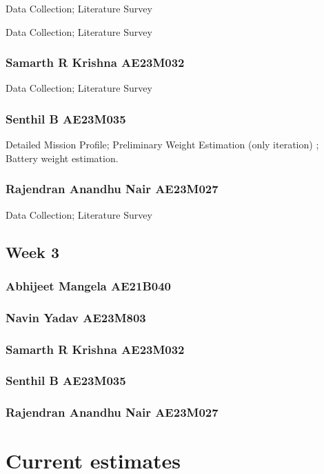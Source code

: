 \documentclass[12 pt]{article}
\begin{document}
Data Collection; Literature Survey


Data Collection; Literature Survey

\subsubsection{Samarth R Krishna AE23M032}

Data Collection; Literature Survey

\subsubsection{Senthil B AE23M035}

Detailed Mission Profile; Preliminary Weight Estimation (only iteration) ; Battery weight estimation.

\subsubsection{Rajendran Anandhu Nair AE23M027}

Data Collection; Literature Survey




\subsection{Week 3}

\subsubsection{Abhijeet Mangela AE21B040}


\subsubsection{Navin Yadav AE23M803}





\subsubsection{Samarth R Krishna AE23M032}



\subsubsection{Senthil B AE23M035}



\subsubsection{Rajendran Anandhu Nair AE23M027}



\section{Current estimates}
\end{document}
